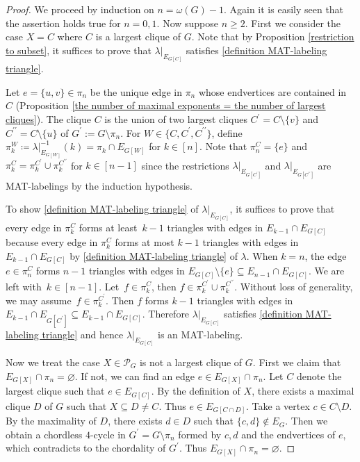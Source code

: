 \begin{proof}
We proceed by induction on $ n = \omega(G)-1 $. 
Again it is easily seen that the assertion holds true for  $ n = 0,1 $.
Now suppose $ n \geq 2 $. 
First we consider the case $X=C$ where $C$ is a largest clique of $ G $. 
Note that by Proposition \ref{restriction to subset}, it suffices to prove that $ \lambda|_{E_{G[C]}} $ satisfies \ref{definition MAT-labeling triangle}. 

Let $e=\{u,v\} \in\pi_n$ be the unique edge in $\pi_n$ whose endvertices are contained in~$C$ (Proposition \ref{the number of maximal exponents = the number of largest cliques}).
The clique $ C $ is the union of two largest cliques $ C^{\prime} = C \setminus  \{v\}$ and $ C^{\prime\prime} = C \setminus  \{u\} $ of $ G^{\prime} := G\setminus\pi_{n} $. 
For $ W \in \{C,C^{\prime}, C^{\prime\prime}\} $, define $ \pi_{k}^{W} \coloneqq \lambda|_{E_{G[W]}}^{-1}(k) = \pi_{k} \cap E_{G[W]} $ for $ k \in [n]$. 
Note that $ \pi_{n}^{C} = \{e\} $ and $ \pi_{k}^{C} = \pi_{k}^{C^{\prime}} \cup \pi_{k}^{C^{\prime\prime}} $ for $ k \in [n-1] $ since the restrictions $ \lambda|_{E_{G[C^{\prime}]}} $ and $ \lambda|_{E_{G[C^{\prime\prime}]}} $ are MAT-labelings by the induction hypothesis. 

To show \ref{definition MAT-labeling triangle} of $ \lambda|_{E_{G[C]}} $, it suffices to prove that every edge in $ \pi_{k}^{C} $ forms at least~$ k-1 $ triangles with edges in $ E_{k-1} \cap E_{G[C]} $ because every edge in $ \pi_{k}^{C} $ forms at most $ k-1 $ triangles with edges in $ E_{k-1} \cap E_{G[C]} $ by \ref{definition MAT-labeling triangle} of $ \lambda $. 
When $ k = n $, the edge~$ e \in \pi_{n}^{C} $ forms $ n-1 $ triangles with edges in $E_{G[C]}\setminus\{e\} \subseteq E_{n-1} \cap E_{G[C]} $. 
We are left with~$ k \in [n-1] $. 
Let~$ f \in \pi_{k}^{C} $, then $ f \in \pi_{k}^{C^{\prime}} \cup \pi_{k}^{C^{\prime\prime}} $. 
Without loss of generality, we may assume~$ f \in \pi_{k}^{C^{\prime}} $. 
Then $f$ forms $ k-1 $ triangles with edges in~$ E_{k-1} \cap E_{G[C^{\prime}]} \subseteq E_{k-1} \cap E_{G[C]} $. 
Therefore $ \lambda|_{E_{G[C]}} $ satisfies \ref{definition MAT-labeling triangle} and hence $ \lambda|_{E_{G[C]}} $ is an MAT-labeling. 

Now we treat the case $ X \in \mathcal{P}_{G} $ is not a largest clique of $ G $. 
First we claim that~$ E_{G[X]} \cap \pi_{n} = \varnothing $. 
If not, we can find an edge $ e \in E_{G[X]} \cap \pi_{n} $. 
Let $ C $ denote the largest clique such that $ e \in E_{G[C]} $. 
By the definition of $X$, there exists a maximal clique $ D $ of $G$ such that $X\subseteq  D \neq C$. 
Thus $ e \in E_{G[C\cap D]} $. 
Take a vertex $ c \in C\setminus D $. 
By the maximality of $ D $, there exists $ d \in D $ such that $\{c,d\} \notin E_G$. 
Then we obtain a chordless $4$-cycle  in $ G^{\prime} = G\setminus \pi_{n} $ formed by $ c,d $ and the endvertices of $ e $, which contradicts to the chordality of $ G^{\prime} $. 
Thus $ E_{G[X]} \cap \pi_{n} = \varnothing $. 


\end{proof}

